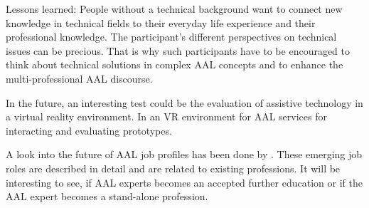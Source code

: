 \documentclass[runningheads,a4paper]{llncs}
\begin{document}
Lessons learned: People without a technical background want to connect new knowledge in technical fields to their everyday life experience and their professional knowledge. The participant’s different perspectives on technical issues can be precious. That is why such participants have to be encouraged to think about technical solutions in complex AAL concepts and to enhance the multi-professional AAL discourse.

In the future, an interesting test could be the evaluation of assistive technology in a virtual reality environment. In \cite{SKMN11} an VR environment for AAL services for interacting and evaluating prototypes.

A look into the future of AAL job profiles has been done by \cite{PTK13}. These emerging job roles are described in detail and are related to existing professions. 
It will be interesting to see, if AAL experts becomes an accepted further education or if the AAL expert becomes a stand-alone profession.



\end{document}
